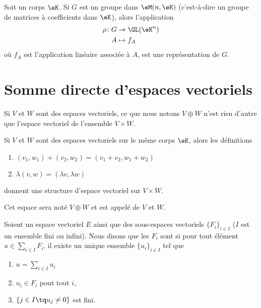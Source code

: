 \begin{proposition}     \label{PROPooHNQOooSzeEFG}
	Soit un corps \( \eK\). Si \( G\) est un groupe dans \( \eM(n,\eK)\) (c'est-à-dire un groupe de matrices à coefficients dans \( \eK\)), alors l'application
	\begin{equation}
		\begin{aligned}
			\rho\colon G & \to \GL(\eK^n) \\
			A            & \mapsto f_A
		\end{aligned}
	\end{equation}
	où \( f_A\) est l'application linéaire associée à \( A\), est une représentation de \( G\).
\end{proposition}


\section{Somme directe d'espaces vectoriels}

Si \( V\) et \( W\) sont des espaces vectoriels, ce que nous notons \( V\oplus W\) n'est rien d'autre que l'espace vectoriel de l'ensemble \( V\times W\).

\begin{propositionDef}                      \label{DEFooJKAWooKkkkwm}
	Si \( V\) et \( W\) sont des espaces vectoriels sur le même corps \( \eK\), alors les définitions
	\begin{enumerate}
		\item
		      \( (v_1,w_1)+(v_2,w_2)=(v_1+v_2,w_1+w_2)\)
		\item
		      \( \lambda(v,w)=(\lambda v,\lambda w)\)
	\end{enumerate}
	donnent une structure d'espace vectoriel sur \( V\times W\).

	Cet espace sera noté \( V\oplus W\) et est appelé  de \( V\) et \( W\).
\end{propositionDef}

\begin{definition}       \label{DEFooIJDNooRUDUYF}
	Soient un espace vectoriel \( E\) ainsi que des sous-espaces vectoriels \( \{ F_i \}_{i\in I}\) (\( I\) est un ensemble fini ou infini). Nous disons que les \( F_i\) sont  si pour tout élément \( u\in\sum_{i\in I}F_i\), il existe un unique ensemble \( \{ u_i \}_{i\in I}\) tel que
	\begin{enumerate}
		\item
		      \( u=\sum_{i\in I}u_i\)
		\item
		      \( u_i\in F_i\) pout tout \( i\),
		\item
		      \( \{ j\in I\tq u_j\neq 0 \}\) est fini.
	\end{enumerate}
\end{definition}

